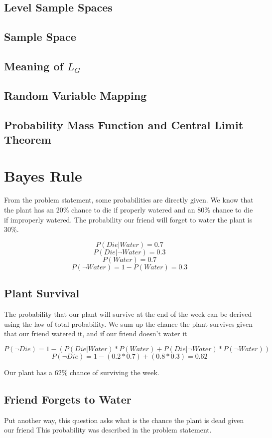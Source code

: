 \documentclass{article}
\begin{document}
\subsection{Level Sample Spaces}
\subsection{Sample Space}
\subsection{Meaning of $L_G$}
\subsection{Random Variable Mapping}
\subsection{Probability Mass Function and Central Limit Theorem}

\newpage
\section{Bayes Rule}

From the problem statement, some probabilities are directly given. We know that the plant has an 20\% chance to die if properly watered and an 80\% chance to die if improperly watered. The probability our friend will forget to water the plant is 30\%.

\[P(Die | Water) = 0.7\]
\[P(Die | \neg Water) = 0.3\]
\[P(Water) = 0.7\]
\[P(\neg Water) = 1 - P(Water) = 0.3\]

\subsection{Plant Survival}
The probability that our plant will survive at the end of the week can be derived using the law of total probability. We sum up the chance the plant survives given that our friend watered it, and if our friend doesn't water it

\[P(\neg Die) = 1 - ( P(Die | Water) * P(Water) + P(Die | \neg Water) * P(\neg Water) ) \]
\[P(\neg Die) = 1 - (0.2*0.7) + (0.8*0.3) = 0.62 \]

\noindent
Our plant has a 62\% chance of surviving the week.

\subsection{Friend Forgets to Water}
Put another way, this question asks what is the chance the plant is dead given our friend  This probability was described in the problem statement.
\end{document}

